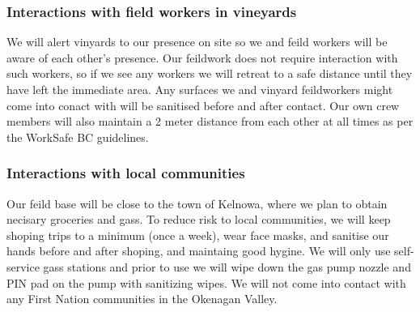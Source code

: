 \documentclass[11pt,letter]{article}
\begin{document}
\subsubsection{Interactions with field workers in vineyards}
We will alert vinyards to our presence on site so we and feild workers will be aware of each other's presence. Our feildwork does not require interaction with such workers, so if we see any workers we will retreat to a safe distance until they have left the immediate area. Any surfaces we and vinyard feildworkers might come into conact with will be sanitised before and after contact. Our own crew members will also maintain a 2 meter distance from each other at all times as per the WorkSafe BC guidelines.   

\subsubsection{Interactions with local communities}
Our feild base will be close to the town of Kelnowa, where we plan to obtain necisary groceries and gass. To reduce risk to local communities, we will keep shoping trips to a minimum (once a week), wear face masks, and sanitise our hands before and after shoping, and maintaing good hygine. We will only use self-service gass stations and prior to use we will wipe down the gas pump nozzle and PIN pad on the pump with sanitizing wipes. We will not come into contact with any First Nation communities in the Okenagan Valley. 
\end{document}
